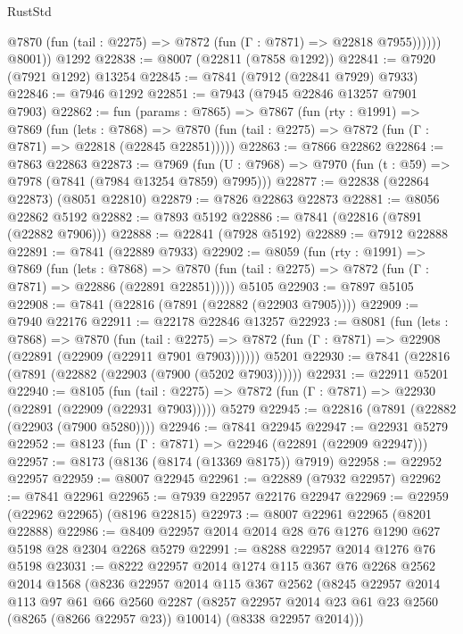 \begin{lexlean}{RustStd}
\begin{coremodule}
{\begin{coremodule}
{{{{{{{{{{{{{{{{{{{{{{{{{{{{{{{{{{{{{{{{{{{{{{{{{{{{{{              @7870 (fun (tail : @2275) => @7872 (fun (Γ : @7871) => @22818 @7955))))))
        @8001))
    @1292
@22838 := @8007 (@22811 (@7858 @1292))
@22841 := @7920 (@7921 @1292) @13254
@22845 := @7841 (@7912 (@22841 @7929) @7933)
@22846 := @7946 @1292
@22851 := @7943 (@7945 @22846 @13257 @7901 @7903)
@22862 := fun (params : @7865) =>
  @7867
    (fun (rty : @1991) =>
    @7869
      (fun (lets : @7868) =>
      @7870 (fun (tail : @2275) => @7872 (fun (Γ : @7871) => @22818 (@22845 @22851)))))
@22863 := @7866 @22862
@22864 := @7863 @22863
@22873 := @7969
    (fun (U : @7968) => @7970 (fun (t : @59) => @7978 (@7841 (@7984 @13254 @7859) @7995)))
@22877 := @22838 (@22864 @22873) (@8051 @22810)
@22879 := @7826 @22863 @22873
@22881 := @8056 @22862 @5192
@22882 := @7893 @5192
@22886 := @7841 (@22816 (@7891 (@22882 @7906)))
@22888 := @22841 (@7928 @5192)
@22889 := @7912 @22888
@22891 := @7841 (@22889 @7933)
@22902 := @8059
    (fun (rty : @1991) =>
    @7869
      (fun (lets : @7868) =>
      @7870 (fun (tail : @2275) => @7872 (fun (Γ : @7871) => @22886 (@22891 @22851)))))
    @5105
@22903 := @7897 @5105
@22908 := @7841 (@22816 (@7891 (@22882 (@22903 @7905))))
@22909 := @7940 @22176
@22911 := @22178 @22846 @13257
@22923 := @8081
    (fun (lets : @7868) =>
    @7870
      (fun (tail : @2275) =>
      @7872 (fun (Γ : @7871) => @22908 (@22891 (@22909 (@22911 @7901 @7903))))))
    @5201
@22930 := @7841 (@22816 (@7891 (@22882 (@22903 (@7900 (@5202 @7903))))))
@22931 := @22911 @5201
@22940 := @8105
    (fun (tail : @2275) => @7872 (fun (Γ : @7871) => @22930 (@22891 (@22909 (@22931 @7903)))))
    @5279
@22945 := @22816 (@7891 (@22882 (@22903 (@7900 @5280))))
@22946 := @7841 @22945
@22947 := @22931 @5279
@22952 := @8123 (fun (Γ : @7871) => @22946 (@22891 (@22909 @22947)))
@22957 := @8173 (@8136 (@8174 (@13369 @8175)) @7919)
@22958 := @22952 @22957
@22959 := @8007 @22945
@22961 := @22889 (@7932 @22957)
@22962 := @7841 @22961
@22965 := @7939 @22957 @22176 @22947
@22969 := @22959 (@22962 @22965) (@8196 @22815)
@22973 := @8007 @22961 @22965 (@8201 @22888)
@22986 := @8409 @22957 @2014 @2014 @28 @76 @1276 @1290 @627 @5198 @28 @2304 @2268 @5279
@22991 := @8288 @22957 @2014 @1276 @76 @5198
@23031 := @8222
    @22957
    @2014
    @1274
    @115
    @367
    @76
    @2268
    @2562
    @2014
    @1568
    (@8236
      @22957
      @2014
      @115
      @367
      @2562
      (@8245
        @22957
        @2014
        @113
        @97
        @61
        @66
        @2560
        @2287
        (@8257 @22957 @2014 @23 @61 @23 @2560 (@8265 (@8266 @22957 @23)) @10014)
        (@8338 @22957 @2014)))
}}}}}}}}}}}}}}}}}}}}}}}}}}}}}}}}}}}}}}}}}}}}}}}}}}}}}}
\end{coremodule}}
\end{coremodule}
\end{lexlean}
